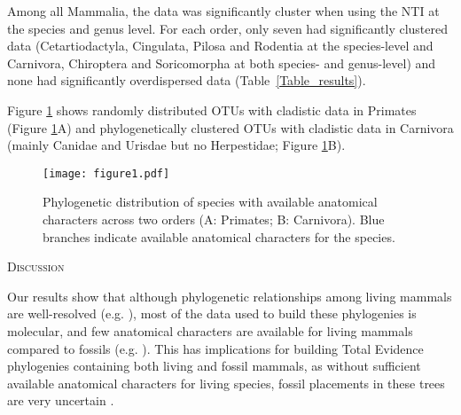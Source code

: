\documentclass[12pt,letterpaper]{article}
\renewcommand{\section}[1]{%
\bigskip
\begin{center}
\begin{Large}
\normalfont\scshape #1
\medskip
\end{Large}
\end{center}}
\begin{document}



Among all Mammalia, the data was significantly cluster when using the NTI at the species and genus level.
For each order, only seven had significantly clustered data (Cetartiodactyla, Cingulata, Pilosa and Rodentia at the species-level and Carnivora, Chiroptera and Soricomorpha at both species- and genus-level) and none had significantly overdispersed data (Table~\ref{Table_results}).

Figure \ref{Figure_example_coverage} shows randomly distributed OTUs with cladistic data in Primates (Figure \ref{Figure_example_coverage}A) and phylogenetically clustered OTUs with cladistic data in Carnivora (mainly Canidae and Urisdae but no Herpestidae; Figure \ref{Figure_example_coverage}B).

\begin{figure}[!htbp]
\centering
    \texttt{[image: figure1.pdf]}
\caption{Phylogenetic distribution of species with available anatomical characters across two orders (A: Primates; B: Carnivora).
Blue branches indicate available anatomical characters for the species.}
\label{Figure_example_coverage}
\end{figure}

%
%

\section{Discussion}
Our results show that although phylogenetic relationships among living mammals are well-resolved (e.g. \cite{BinindaEmonds,meredithimpacts2011}), most of the data used to build these phylogenies is molecular, and few anatomical characters are available for living mammals compared to fossils (e.g. \cite{O'Leary08022013,ni2013oldest}).
This has implications for building Total Evidence phylogenies containing both living and fossil mammals, as without sufficient available anatomical characters for living species, fossil placements in these trees are very uncertain \cite{GuillermeCooper}.
\end{document}
